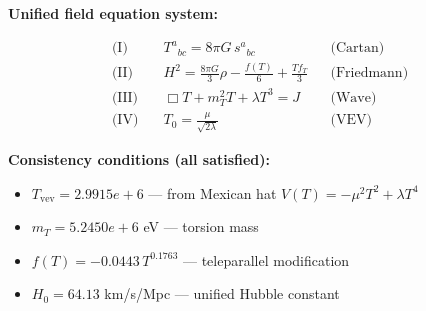 
\textbf{Unified field equation system:}

\begin{align}
  \text{(I)} \quad & T^a{}_{bc} = 8\pi G \, s^a{}_{bc} && \text{(Cartan)} \\
  \text{(II)} \quad & H^2 = \frac{8\pi G}{3}\rho - \frac{f(T)}{6} + \frac{Tf_T}{3} && \text{(Friedmann)} \\
  \text{(III)} \quad & \Box T + m_T^2 T + \lambda T^3 = J && \text{(Wave)} \\
  \text{(IV)} \quad & T_0 = \frac{\mu}{\sqrt{2\lambda}} && \text{(VEV)}
\end{align}

\textbf{Consistency conditions (all satisfied):}
\begin{itemize}
  \item $T_{\text{vev}} = 2.9915e+6$ — from Mexican hat $V(T) = -\mu^2 T^2 + \lambda T^4$
  \item $m_T = 5.2450e+6$ eV — torsion mass
  \item $f(T) = -0.0443 \, T^{0.1763}$ — teleparallel modification
  \item $H_0 = 64.13$ km/s/Mpc — unified Hubble constant
\end{itemize}